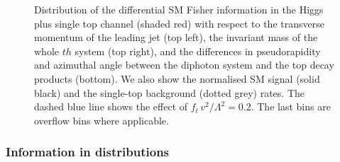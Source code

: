 \begin{figure}
  \caption{Distribution of the differential SM Fisher information in
    the Higgs plus single top channel (shaded red) with respect to the
    transverse momentum of the leading jet (top left), the invariant
    mass of the whole $th$ system (top right), and the differences in
    pseudorapidity and azimuthal angle between the diphoton system and
    the top decay products (bottom). We also show the normalised SM
    signal (solid black) and the single-top background (dotted grey)
    rates. The dashed blue line shows the effect of
    $f_{t} \, v^2 / \Lambda^2 = 0.2$. The last bins are overflow bins
    where applicable.}
  \label{fig:information_th_differential_information_jets}
\end{figure}




\subsubsection*{Information in distributions}

